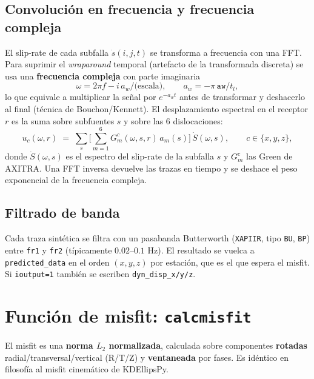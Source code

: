 \documentclass[11pt,a4paper]{article}
\begin{document}
\subsection{Convolución en frecuencia y frecuencia compleja}
El slip-rate de cada subfalla $\dot{s}(i,j,t)$ se transforma a frecuencia con una
FFT. Para suprimir el \emph{wraparound} temporal (artefacto de la transformada
discreta) se usa una \textbf{frecuencia compleja} con parte imaginaria
\begin{equation}
  \omega = 2\pi f - i\,a_w/\text{(escala)} ,\qquad
  a_w = -\pi\,\texttt{aw}/t_l ,
\end{equation}
lo que equivale a multiplicar la señal por $e^{-a_w t}$ antes de transformar y
deshacerlo al final (técnica de Bouchon/Kennett). El desplazamiento espectral en
el receptor $r$ es la suma sobre subfuentes $s$ y sobre las 6 dislocaciones:
\begin{equation}
  u_c(\omega, r) \;=\; \sum_{s} \Big[\sum_{m=1}^{6} G^{c}_{m}(\omega,s,r)\,a_m(s)\Big]\,
                       \dot{S}(\omega,s),
  \qquad c\in\{x,y,z\},
\end{equation}
donde $\dot{S}(\omega,s)$ es el espectro del slip-rate de la subfalla $s$ y
$G^c_m$ las Green de AXITRA. Una FFT inversa devuelve las trazas en tiempo y se
deshace el peso exponencial de la frecuencia compleja.

\subsection{Filtrado de banda}
Cada traza sintética se filtra con un pasabanda Butterworth (\texttt{XAPIIR},
tipo \texttt{BU}, \texttt{BP}) entre \texttt{fr1} y \texttt{fr2} (típicamente
$0.02$--$0.1$ Hz). El resultado se vuelca a \texttt{predicted\_data} en el orden
$(x,y,z)$ por estación, que es el que espera el misfit. Si \texttt{ioutput=1}
también se escriben \texttt{dyn\_disp\_x/y/z}.

\section{Función de misfit: \texttt{calcmisfit}}

El misfit es una \textbf{norma $L_2$ normalizada}, calculada sobre componentes
\textbf{rotadas} radial/transversal/vertical (R/T/Z) y \textbf{ventaneada} por
fases. Es idéntico en filosofía al misfit cinemático de KDEllipsPy.
\end{document}
